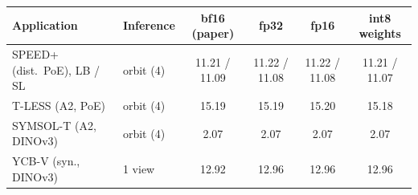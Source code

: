 \begin{tabular}{@{}ll cccc@{}}
\toprule
Application & Inference & bf16 (paper) & fp32 & fp16 & int8 weights \\
\midrule
SPEED+ (dist.\ PoE), LB / SL & orbit (4) & 11.21 / 11.09 & 11.22 / 11.08 & 11.22 / 11.08 & 11.21 / 11.07 \\
T-LESS (A2, PoE) & orbit (4) & 15.19 & 15.19 & 15.20 & 15.18 \\
SYMSOL-T (A2, DINOv3) & orbit (4) & 2.07 & 2.07 & 2.07 & 2.07 \\
YCB-V (syn., DINOv3) & 1 view & 12.92 & 12.96 & 12.96 & 12.96 \\
\bottomrule
\end{tabular}